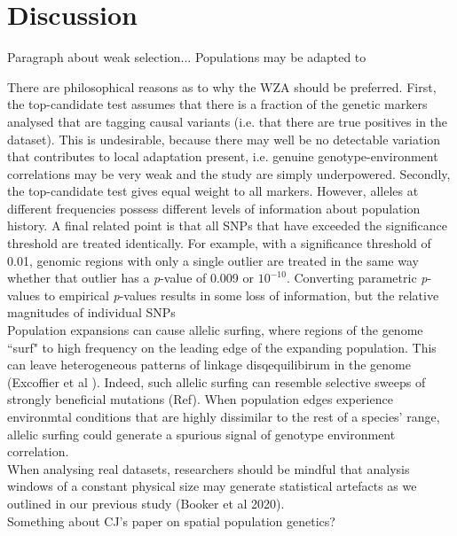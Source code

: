 \documentclass[10pt,twoside,lineno, twocolumn]{GSA_format}
\begin{document}
\section{Discussion}



Paragraph about weak selection...
Populations may be adapted to 


There are philosophical reasons as to why the WZA should be preferred. First, the top-candidate test assumes that there is a fraction of the genetic markers analysed that are tagging causal variants (i.e. that there are true positives in the dataset). This is undesirable, because there may well be no detectable variation that contributes to local adaptation present, i.e. genuine genotype-environment correlations may be very weak and the study are simply underpowered. Secondly, the top-candidate test gives equal weight to all markers. However, alleles at different frequencies possess different levels of information about population history. A final related point is that all SNPs that have exceeded the significance threshold are treated identically. For example, with a significance threshold of 0.01, genomic regions with only a single outlier are treated in the same way whether that outlier has a \textit{p}-value of 0.009 or $10^{-10}$. Converting parametric \textit{p}-values to empirical \textit{p}-values results in some loss of information, but the relative magnitudes of individual SNPs  \\

Population expansions can cause allelic surfing, where regions of the genome ``surf" to high frequency on the leading edge of the expanding population. This can leave heterogeneous patterns of linkage disqequilibirum in the genome (Excoffier et al ). Indeed, such allelic surfing can resemble selective sweeps of strongly beneficial mutations (Ref). When population edges experience environmtal conditions that are highly dissimilar to the rest of a species' range, allelic surfing could generate a spurious signal of genotype environment correlation. \\ 


When analysing real datasets, researchers should be mindful that analysis windows of a constant physical size may generate statistical artefacts as we outlined in our previous study (Booker et al 2020). \\

Something about CJ's paper on spatial population genetics? \\
\end{document}
